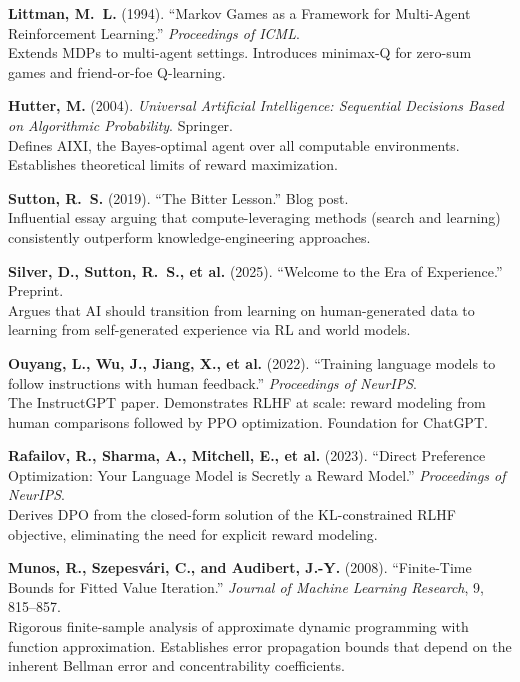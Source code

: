 \documentclass[11pt,a4paper]{article}
\begin{document}
\begin{enumerate}[label={[\arabic*]}, leftmargin=*, itemsep=6pt]
\item \textbf{Littman, M.~L.} (1994).
  ``Markov Games as a Framework for Multi-Agent Reinforcement Learning.''
  \textit{Proceedings of ICML}. \\
  Extends MDPs to multi-agent settings. Introduces minimax-Q for zero-sum
  games and friend-or-foe Q-learning.

\item \textbf{Hutter, M.} (2004).
  \textit{Universal Artificial Intelligence: Sequential Decisions Based on
  Algorithmic Probability}. Springer. \\
  Defines AIXI, the Bayes-optimal agent over all computable environments.
  Establishes theoretical limits of reward maximization.

\item \textbf{Sutton, R.~S.} (2019).
  ``The Bitter Lesson.'' Blog post. \\
  Influential essay arguing that compute-leveraging methods (search and
  learning) consistently outperform knowledge-engineering approaches.

\item \textbf{Silver, D., Sutton, R.~S., et al.} (2025).
  ``Welcome to the Era of Experience.'' Preprint. \\
  Argues that AI should transition from learning on human-generated data to
  learning from self-generated experience via RL and world models.

\item \textbf{Ouyang, L., Wu, J., Jiang, X., et al.} (2022).
  ``Training language models to follow instructions with human feedback.''
  \textit{Proceedings of NeurIPS}. \\
  The InstructGPT paper. Demonstrates RLHF at scale: reward modeling from
  human comparisons followed by PPO optimization. Foundation for ChatGPT.

\item \textbf{Rafailov, R., Sharma, A., Mitchell, E., et al.} (2023).
  ``Direct Preference Optimization: Your Language Model is Secretly a Reward
  Model.'' \textit{Proceedings of NeurIPS}. \\
  Derives DPO from the closed-form solution of the KL-constrained RLHF
  objective, eliminating the need for explicit reward modeling.

\item \textbf{Munos, R., Szepesv\'ari, C., and Audibert, J.-Y.} (2008).
  ``Finite-Time Bounds for Fitted Value Iteration.''
  \textit{Journal of Machine Learning Research}, 9, 815--857. \\
  Rigorous finite-sample analysis of approximate dynamic programming with
  function approximation. Establishes error propagation bounds that depend
  on the inherent Bellman error and concentrability coefficients.


\end{enumerate}
\end{document}
